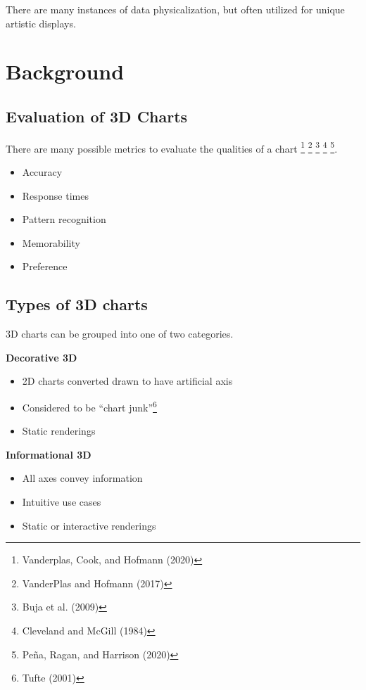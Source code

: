 \documentclass[phd]{nuthesis}
\begin{document}
There are many instances of data physicalization, but often utilized for
unique artistic displays.

\section{Background}\label{background}

\subsection{Evaluation of 3D Charts}\label{evaluation-of-3d-charts}

There are many possible metrics to evaluate the qualities of a chart
\footnote{Vanderplas, Cook, and Hofmann (2020)} \footnote{VanderPlas and
  Hofmann (2017)} \footnote{Buja et al. (2009)} \footnote{Cleveland and
  McGill (1984)} \footnote{Peña, Ragan, and Harrison (2020)}.

\begin{itemize}
\item
  Accuracy
\item
  Response times
\item
  Pattern recognition
\item
  Memorability
\item
  Preference
\end{itemize}

\subsection{Types of 3D charts}\label{types-of-3d-charts}

3D charts can be grouped into one of two categories.

\textbf{Decorative 3D}

\begin{itemize}
\tightlist
\item
  2D charts converted drawn to have artificial axis
\item
  Considered to be ``chart junk''\footnote{Tufte (2001)}
\item
  Static renderings
\end{itemize}

\textbf{Informational 3D}

\begin{itemize}
\tightlist
\item
  All axes convey information
\item
  Intuitive use cases
\item
  Static or interactive renderings
\end{itemize}
\end{document}
